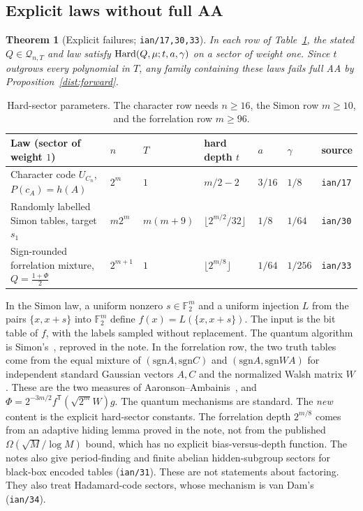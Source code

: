 \documentclass[11pt]{article}
\newtheorem{theorem}{Theorem}[section]
\theoremstyle{definition}\newtheorem{definition}[theorem]{Definition}
\theoremstyle{remark}\newtheorem{remark}[theorem]{Remark}
\newcommand{\mc}{\mathcal}\newcommand{\eps}{\varepsilon}
\begin{document}
\subsection{Explicit laws without full AA}\label{dist:failures-sec}
\begin{theorem}[Explicit failures; \texttt{ian/17,30,33}]\label{dist:failures}
In each row of Table~\ref{dist:table}, the stated \(Q\in\mc Q_{n,T}\) and law
satisfy \(\operatorname{Hard}(Q,\mu;t,a,\gamma)\) on a sector of weight one. Since \(t\)
outgrows every polynomial in \(T\), any family containing these laws fails full
AA by Proposition~\ref{dist:forward}.
\end{theorem}
\begin{table}[h]
\centering\small
\begin{tabular}{@{}lllllll@{}}
\toprule
Law (sector of weight \(1\)) & \(n\) & \(T\) & hard depth \(t\) & \(a\) & \(\gamma\) & source\\
\midrule
Character code \(U_{C_n}\), \(P(c_A)=h(A)\) & \(2^m\) & \(1\) & \(m/2-2\) & \(3/16\) & \(1/8\) & \texttt{ian/17}\\
Randomly labelled Simon tables, target \(s_1\) & \(m2^m\) & \(m(m+9)\) & \(\lfloor2^{m/2}/32\rfloor\) & \(1/8\) & \(1/64\) & \texttt{ian/30}\\
Sign-rounded forrelation mixture, \(Q=\frac{1+\Phi}2\) & \(2^{m+1}\) & \(1\) & \(\lfloor2^{m/8}\rfloor\) & \(1/64\) & \(1/256\) & \texttt{ian/33}\\
\bottomrule
\end{tabular}
\caption{Hard-sector parameters. The character row needs \(n\ge16\), the Simon
row \(m\ge10\), and the forrelation row \(m\ge96\).}\label{dist:table}
\end{table}
In the Simon law, a uniform nonzero \(s\in\mathbb F_2^m\) and a uniform injection
\(L\) from the pairs \(\{x,x+s\}\) into \(\mathbb F_2^m\) define
\(f(x)=L(\{x,x+s\})\). The input is the bit table of \(f\), with the labels
sampled without replacement. The quantum algorithm is Simon's~\cite{Sim97},
reproved in the note. In the forrelation row, the two truth tables come from
the equal mixture of \((\mathrm{sgn}A,\mathrm{sgn}C)\) and
\((\mathrm{sgn}A,\mathrm{sgn}WA)\) for independent standard Gaussian vectors
\(A,C\) and the normalized Walsh matrix \(W\). These are the two measures of
Aaronson--Ambainis~\cite{AA15}, and
\(\Phi=2^{-3m/2}f^{\mathsf T}(\sqrt{2^m}W)g\). The quantum mechanisms are
standard. The \emph{new} content is the explicit hard-sector constants. The
forrelation depth \(2^{m/8}\) comes from an adaptive hiding lemma proved in the
note, not from the published \(\Omega(\sqrt M/\log M)\) bound, which has no
explicit bias-versus-depth function. The notes also give period-finding and
finite abelian hidden-subgroup sectors for black-box encoded tables
(\texttt{ian/31}). These are not statements about factoring. They also treat
Hadamard-code sectors, whose mechanism is van Dam's~\cite{vD02}
(\texttt{ian/34}).
\end{document}
